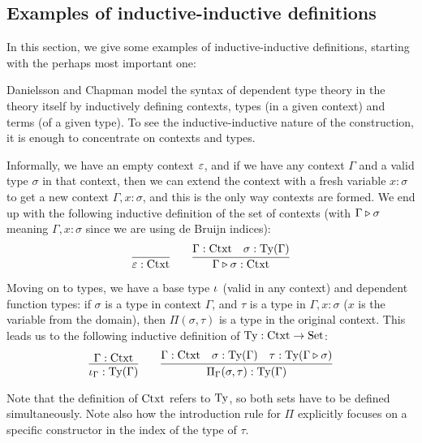 \documentclass{article}
\begin{document}






\subsection{Examples of inductive-inductive definitions}
\label{sec:examples}

In this section, we give some examples of inductive-inductive
definitions, starting with the perhaps most important one:

\begin{example}
\label{ex:ctxt-type}

Danielsson \cite{danielsson2007formalisation} and Chapman
\cite{chapman2009eatitself} model the syntax of dependent type theory
in the theory itself by inductively defining contexts, types (in a
given context) and terms (of a given type). To see the
inductive-inductive nature of the construction, it is enough to
concentrate on contexts and types.

Informally, we have an empty context $\varepsilon$, and if we have any
context $\Gamma$ and a valid type $\sigma$ in that context, then we
can extend the context with a fresh variable $x : \sigma$ to get a new
context $\Gamma, x : \sigma$, and this is the only way contexts are
formed. We end up with the following inductive definition of the set
of contexts (with $\Gamma \triangleright \sigma$ meaning $\Gamma, x :
\sigma$ since we are using de Bruijn indices):
\[
\infer{\emptyCtxt : \Ctxt}{} \qquad
\infer{\consCtxt{\Gamma}{\sigma} : \Ctxt}{\Gamma : \Ctxt & \sigma : \Ty(\Gamma)}
\]

Moving on to types, we have a base type $\iota_{}$ (valid in any
context) and dependent function types: if $\sigma$ is a type in
context $\Gamma$, and $\tau$ is a type in $\Gamma, x : \sigma$ ($x$ is
the variable from the domain), then $\Pi(\sigma, \tau)$ is a type in
the original context. This leads us to the following inductive
definition of $\text{Ty} : \text{Ctxt} \to \text{Set}$:
\[
\infer{\baseTy{\Gamma} : \Ty(\Gamma)}{\Gamma : \Ctxt} \qquad
\infer{\piTy{\Gamma}{\sigma}{\tau} : \Ty(\Gamma)}{\Gamma : \Ctxt
                    & \sigma : \Ty(\Gamma)
                    & \tau : \Ty(\consCtxt{\Gamma}{\sigma})}
\]

Note that the definition of $\text{Ctxt}$ refers to $\text{Ty}$, so both sets have
to be defined simultaneously. Note also how the introduction rule for
$\Pi$ explicitly focuses on a specific constructor in the index of the
type of $\tau$. 
\blackqed
\end{example}
\end{document}
